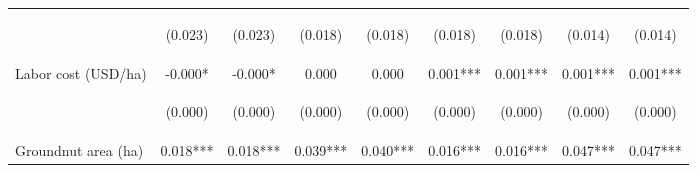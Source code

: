 \begin{center}
\begin{tabular}{lcccccccc}
\vspace{4pt} & \begin{footnotesize}(0.023)\end{footnotesize} & \begin{footnotesize}(0.023)\end{footnotesize} & \begin{footnotesize}(0.018)\end{footnotesize} & \begin{footnotesize}(0.018)\end{footnotesize} & \begin{footnotesize}(0.018)\end{footnotesize} & \begin{footnotesize}(0.018)\end{footnotesize} & \begin{footnotesize}(0.014)\end{footnotesize} & \begin{footnotesize}(0.014)\end{footnotesize} \\
Labor cost (USD/ha) & -0.000* & -0.000* & 0.000 & 0.000 & 0.001*** & 0.001*** & 0.001*** & 0.001*** \\
\vspace{4pt} & \begin{footnotesize}(0.000)\end{footnotesize} & \begin{footnotesize}(0.000)\end{footnotesize} & \begin{footnotesize}(0.000)\end{footnotesize} & \begin{footnotesize}(0.000)\end{footnotesize} & \begin{footnotesize}(0.000)\end{footnotesize} & \begin{footnotesize}(0.000)\end{footnotesize} & \begin{footnotesize}(0.000)\end{footnotesize} & \begin{footnotesize}(0.000)\end{footnotesize} \\
Groundnut area (ha) & 0.018*** & 0.018*** & 0.039*** & 0.040*** & 0.016*** & 0.016*** & 0.047*** & 0.047*** \\

\end{tabular}
\end{center}
